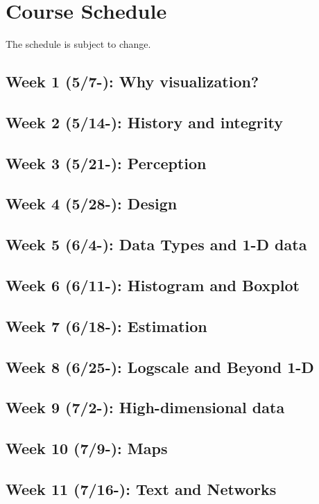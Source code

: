 \documentclass[11pt,article,oneside]{memoir} %
\begin{document}
\section{Course Schedule}%

The schedule is subject to change. 


\subsection{Week 1 (5/7-): Why visualization? }
\subsection{Week 2 (5/14-): History and integrity  }
\subsection{Week 3 (5/21-): Perception }
\subsection{Week 4 (5/28-): Design }
\subsection{Week 5 (6/4-): Data Types and 1-D data }
\subsection{Week 6 (6/11-): Histogram and Boxplot } 
\subsection{Week 7 (6/18-): Estimation }
\subsection{Week 8 (6/25-): Logscale and Beyond 1-D }
\subsection{Week 9 (7/2-): High-dimensional data }
\subsection{Week 10 (7/9-): Maps }
\subsection{Week 11 (7/16-): Text and Networks}
\end{document}

